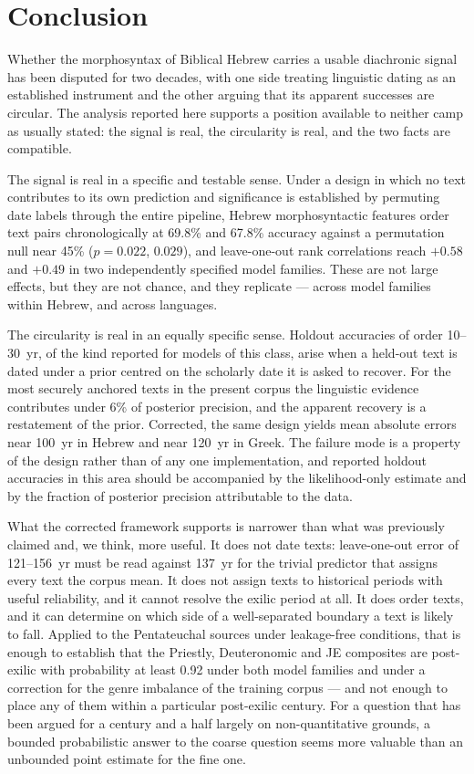 \documentclass[10pt,letterpaper]{article}
\begin{document}
\section*{Conclusion}

Whether the morphosyntax of Biblical Hebrew carries a usable diachronic
signal has been disputed for two decades, with one side treating linguistic
dating as an established instrument and the other arguing that its apparent
successes are circular.  The analysis reported here supports a position
available to neither camp as usually stated: the signal is real, the
circularity is real, and the two facts are compatible.

The signal is real in a specific and testable sense.  Under a design in
which no text contributes to its own prediction and significance is
established by permuting date labels through the entire pipeline, Hebrew
morphosyntactic features order text pairs chronologically at 69.8\% and
67.8\% accuracy against a permutation null near 45\% ($p = 0.022$,
$0.029$), and leave-one-out rank correlations reach $+0.58$ and $+0.49$ in
two independently specified model families.  These are not large effects,
but they are not chance, and they replicate --- across model families
within Hebrew, and across languages.

The circularity is real in an equally specific sense.  Holdout accuracies
of order 10--30~yr, of the kind reported for models of this class, arise
when a held-out text is dated under a prior centred on the scholarly date it
is asked to recover.  For the most securely anchored
texts in the present corpus the linguistic evidence contributes under 6\%
of posterior precision, and the apparent recovery is a restatement of the
prior.  Corrected, the same design yields mean absolute errors near 100~yr
in Hebrew and near 120~yr in Greek.  The failure mode is a property of the
design rather than of any one implementation, and reported holdout
accuracies in this area should be accompanied by the likelihood-only
estimate and by the fraction of posterior precision attributable to the
data.

What the corrected framework supports is narrower than what was previously
claimed and, we think, more useful.  It does not date texts: leave-one-out
error of 121--156~yr must be read against 137~yr for the trivial predictor
that assigns every text the corpus mean.  It does not assign texts to
historical periods with useful reliability, and it cannot resolve the
exilic period at all.  It does order texts, and it can determine on which
side of a well-separated boundary a text is likely to fall.  Applied to the
Pentateuchal sources under leakage-free conditions, that is enough to
establish that the Priestly, Deuteronomic and JE composites are post-exilic
with probability at least 0.92 under both model families and under a
correction for the genre imbalance of the training corpus --- and not
enough to place any of them within a particular post-exilic century.  For a
question that has been argued for a century and a half largely on
non-quantitative grounds, a bounded probabilistic answer to the coarse
question seems more valuable than an unbounded point estimate for the fine
one.
\end{document}
